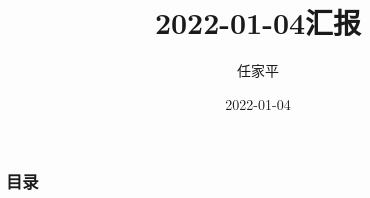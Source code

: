 \documentclass[12pt, utf-8]{beamer}
\title{2022-01-04汇报}
\author{任家平}
\institute{同济大学测绘与地理信息学院}
\date{2022-01-04}
\begin{document}
\begin{frame}
    \titlepage
\end{frame}

\begin{frame}
    \frametitle{目录}
    \tableofcontents
\end{frame}






%     

% 
\end{document}
